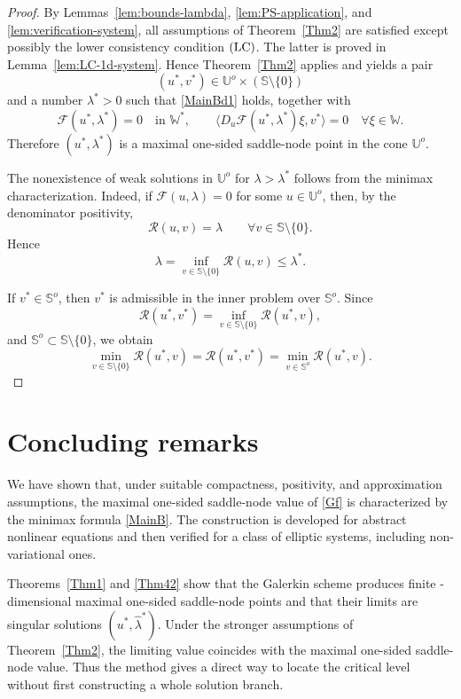 \documentclass[preprint,10pt]{elsarticle}
\numberwithin{equation}{section}
\begin{document}
\begin{proof}
	By Lemmas~\ref{lem:bounds-lambda}, \ref{lem:PS-application}, and
	\ref{lem:verification-system}, all assumptions of Theorem~\ref{Thm2} are
	satisfied except possibly the lower consistency condition \({\rm (LC)}\).
	The latter is proved in Lemma~\ref{lem:LC-1d-system}. Hence
	Theorem~\ref{Thm2} applies and yields a pair
	\[
	(u^*,v^*)\in\mathbb U^o\times(\mathbb S\setminus\{0\})
	\]
	and a number \(\lambda^*>0\) such that \eqref{MainBd1} holds, together
	with
	\[
	\mathcal F(u^*,\lambda^*)=0
	\quad\text{in }\mathbb W^*,
	\qquad
	\bigl\langle
	D_u\mathcal F(u^*,\lambda^*)\xi,v^*
	\bigr\rangle=0
	\quad \forall \xi\in\mathbb W .
	\]
	Therefore \((u^*,\lambda^*)\) is a maximal one-sided saddle-node point in
	the cone \(\mathbb U^o\).
	
	The nonexistence of weak solutions in \(\mathbb U^o\) for
	\(\lambda>\lambda^*\) follows from the minimax characterization. Indeed,
	if \(\mathcal F(u,\lambda)=0\) for some \(u\in\mathbb U^o\), then, by the
	denominator positivity,
	\[
	\mathcal R(u,v)=\lambda
	\qquad
	\forall v\in\mathbb S\setminus\{0\}.
	\]
	Hence
	\[
	\lambda
	=
	\inf_{v\in\mathbb S\setminus\{0\}}\mathcal R(u,v)
	\le
	\lambda^* .
	\]
	
	If \(v^*\in\mathbb S^o\), then \(v^*\) is admissible in the inner problem
	over \(\mathbb S^o\). Since
	\[
	\mathcal R(u^*,v^*)
	=
	\inf_{v\in\mathbb S\setminus\{0\}}\mathcal R(u^*,v),
	\]
	and \(\mathbb S^o\subset\mathbb S\setminus\{0\}\), we obtain
	\[
	\min_{v\in\mathbb S\setminus\{0\}}\mathcal R(u^*,v)
	=
	\mathcal R(u^*,v^*)
	=
	\min_{v\in\mathbb S^o}\mathcal R(u^*,v).
	\]
\end{proof}






\section{Concluding remarks}
\label{sec:ConcRem}

We have shown that, under suitable compactness, positivity, and approximation
assumptions, the maximal one-sided saddle-node value of \eqref{Gf} is
characterized by the minimax formula \eqref{MainB}. The construction is
developed for abstract nonlinear equations and then verified for a class of
elliptic systems, including non-variational ones.

Theorems~\ref{Thm1} and \ref{Thm42} show that the Galerkin scheme produces
finite - dimensional maximal one-sided saddle-node points and that their limits
are singular solutions \((u^*,\hat\lambda^*)\). Under the stronger assumptions
of Theorem~\ref{Thm2}, the limiting value coincides with the maximal
one-sided saddle-node value. Thus the method gives a direct way to locate the
critical level without first constructing a whole solution branch.
\end{document}
